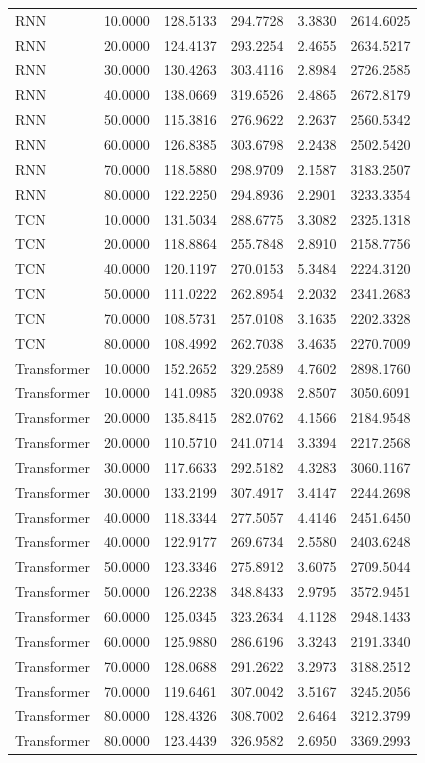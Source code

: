 \begin{tabular}{lrrrrr}
RNN & 10.0000 & 128.5133 & 294.7728 & 3.3830 & 2614.6025 \\
RNN & 20.0000 & 124.4137 & 293.2254 & 2.4655 & 2634.5217 \\
RNN & 30.0000 & 130.4263 & 303.4116 & 2.8984 & 2726.2585 \\
RNN & 40.0000 & 138.0669 & 319.6526 & 2.4865 & 2672.8179 \\
RNN & 50.0000 & 115.3816 & 276.9622 & 2.2637 & 2560.5342 \\
RNN & 60.0000 & 126.8385 & 303.6798 & 2.2438 & 2502.5420 \\
RNN & 70.0000 & 118.5880 & 298.9709 & 2.1587 & 3183.2507 \\
RNN & 80.0000 & 122.2250 & 294.8936 & 2.2901 & 3233.3354 \\
TCN & 10.0000 & 131.5034 & 288.6775 & 3.3082 & 2325.1318 \\
TCN & 20.0000 & 118.8864 & 255.7848 & 2.8910 & 2158.7756 \\
TCN & 40.0000 & 120.1197 & 270.0153 & 5.3484 & 2224.3120 \\
TCN & 50.0000 & 111.0222 & 262.8954 & 2.2032 & 2341.2683 \\
TCN & 70.0000 & 108.5731 & 257.0108 & 3.1635 & 2202.3328 \\
TCN & 80.0000 & 108.4992 & 262.7038 & 3.4635 & 2270.7009 \\
Transformer & 10.0000 & 152.2652 & 329.2589 & 4.7602 & 2898.1760 \\
Transformer & 10.0000 & 141.0985 & 320.0938 & 2.8507 & 3050.6091 \\
Transformer & 20.0000 & 135.8415 & 282.0762 & 4.1566 & 2184.9548 \\
Transformer & 20.0000 & 110.5710 & 241.0714 & 3.3394 & 2217.2568 \\
Transformer & 30.0000 & 117.6633 & 292.5182 & 4.3283 & 3060.1167 \\
Transformer & 30.0000 & 133.2199 & 307.4917 & 3.4147 & 2244.2698 \\
Transformer & 40.0000 & 118.3344 & 277.5057 & 4.4146 & 2451.6450 \\
Transformer & 40.0000 & 122.9177 & 269.6734 & 2.5580 & 2403.6248 \\
Transformer & 50.0000 & 123.3346 & 275.8912 & 3.6075 & 2709.5044 \\
Transformer & 50.0000 & 126.2238 & 348.8433 & 2.9795 & 3572.9451 \\
Transformer & 60.0000 & 125.0345 & 323.2634 & 4.1128 & 2948.1433 \\
Transformer & 60.0000 & 125.9880 & 286.6196 & 3.3243 & 2191.3340 \\
Transformer & 70.0000 & 128.0688 & 291.2622 & 3.2973 & 3188.2512 \\
Transformer & 70.0000 & 119.6461 & 307.0042 & 3.5167 & 3245.2056 \\
Transformer & 80.0000 & 128.4326 & 308.7002 & 2.6464 & 3212.3799 \\
Transformer & 80.0000 & 123.4439 & 326.9582 & 2.6950 & 3369.2993 \\
\bottomrule
\end{tabular}
